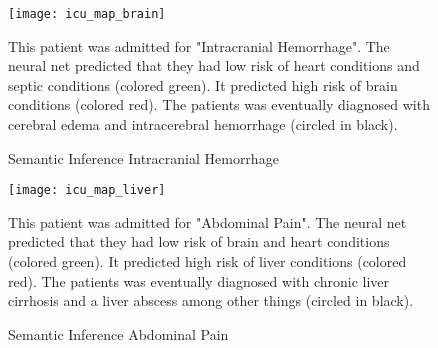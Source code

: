 \begin{figure}
\texttt{[image: icu\_map\_brain]}
\caption{Semantic Inference Intracranial Hemorrhage}
\vspace{12px}
This patient was admitted for "Intracranial Hemorrhage".  The neural net predicted that they had low risk of heart conditions and septic conditions (colored green).  It predicted high risk of brain conditions (colored red).  The patients was eventually diagnosed with cerebral edema and intracerebral hemorrhage (circled in black).
\label{fig:icu_map_brain}
\end{figure}

\begin{figure}
\texttt{[image: icu\_map\_liver]}
\caption{Semantic Inference Abdominal Pain}
\vspace{12px}
This patient was admitted for "Abdominal Pain".  The neural net predicted that they had low risk of brain and heart conditions (colored green).  It predicted high risk of liver conditions (colored red).  The patients was eventually diagnosed with chronic liver cirrhosis and a liver abscess among other things (circled in black).
\label{fig:icu_map_liver}
\end{figure}